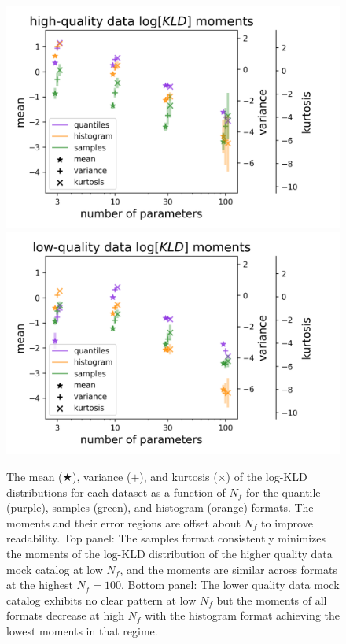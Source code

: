 \documentclass[\docopts]{\docclass}
\begin{document}
\begin{figure}
  \includegraphics[width=0.9\columnwidth]{graham_moments.png}\\
  \includegraphics[width=0.9\columnwidth]{schmidt_moments.png}
  \caption{The mean ($\bigstar$), variance ($+$), and kurtosis ($\times$) of 
the log-KLD distributions for each dataset as a function of $N_{f}$ for the 
quantile (purple), samples (green), and histogram (orange) formats.
  The moments and their error regions are offset about $N_{f}$ to improve 
readability.
  Top panel: The samples format consistently minimizes the moments of the 
log-KLD distribution of the higher quality data mock catalog at low $N_{f}$, 
and the moments are similar across formats at the highest $N_{f}=100$.
  Bottom panel: The lower quality data mock catalog exhibits no clear pattern 
at low $N_{f}$ but the moments of all formats decrease at high $N_{f}$ with the 
histogram format achieving the lowest moments in that regime.
  \label{fig:moments}}
\end{figure}
\end{document}
